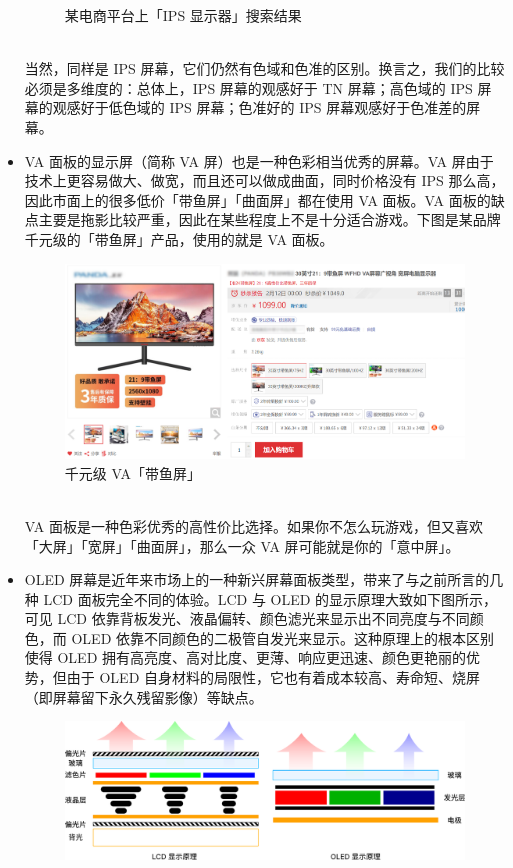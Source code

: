 \begin{itemize}
\begin{figure}[htb!]
      \caption{某电商平台上「IPS 显示器」搜索结果}
      \label{fig:IPS_screens}
    \end{figure}\\
    当然，同样是 IPS 屏幕，它们仍然有色域和色准的区别。换言之，我们的比较必须是多维度的：总体上，IPS 屏幕的观感好于 TN 屏幕；高色域的 IPS 屏幕的观感好于低色域的 IPS 屏幕；色准好的 IPS 屏幕观感好于色准差的屏幕。
  \item VA 面板的显示屏（简称 VA 屏）也是一种色彩相当优秀的屏幕。VA 屏由于技术上更容易做大、做宽，而且还可以做成曲面，同时价格没有 IPS 那么高，因此市面上的很多低价「带鱼屏」「曲面屏」都在使用 VA 面板。VA 面板的缺点主要是拖影比较严重，因此在某些程度上不是十分适合游戏。下图是某品牌千元级的「带鱼屏」产品，使用的就是 VA 面板。
    \begin{figure}[htb!]
      \centering
      \includegraphics[width=.8\textwidth]{assets/advanced/Cheap_VA_screen.png}
      \caption{千元级 VA「带鱼屏」}
      \label{fig:Cheap_VA_screen}
    \end{figure}\\
    VA 面板是一种色彩优秀的高性价比选择。如果你不怎么玩游戏，但又喜欢「大屏」「宽屏」「曲面屏」，那么一众 VA 屏可能就是你的「意中屏」。
  \item OLED 屏幕是近年来市场上的一种新兴屏幕面板类型，带来了与之前所言的几种 LCD 面板完全不同的体验。LCD 与 OLED 的显示原理大致如下图所示，可见 LCD 依靠背板发光、液晶偏转、颜色滤光来显示出不同亮度与不同颜色，而 OLED 依靠不同颜色的二极管自发光来显示。这种原理上的根本区别使得 OLED 拥有高亮度、高对比度、更薄、响应更迅速、颜色更艳丽的优势，但由于 OLED 自身材料的局限性，它也有着成本较高、寿命短、烧屏（即屏幕留下永久残留影像）等缺点。
    \begin{figure}[htb!]
      \centering
      \includegraphics[width=.95\textwidth]{assets/advanced/LCD_OLED.pdf}

\end{figure}
\end{itemize}
